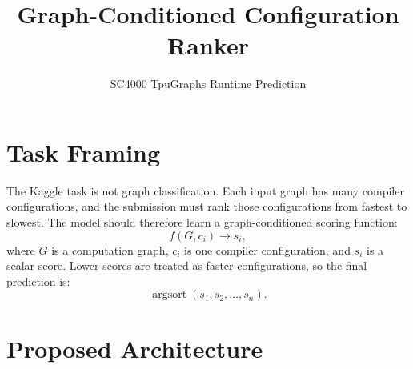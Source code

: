 \documentclass[11pt]{article}
\title{Graph-Conditioned Configuration Ranker}
\author{SC4000 TpuGraphs Runtime Prediction}
\date{}
\begin{document}
\maketitle

\section{Task Framing}

The Kaggle task is not graph classification. Each input graph has many compiler
configurations, and the submission must rank those configurations from fastest to
slowest. The model should therefore learn a graph-conditioned scoring function:
\[
f(G, c_i) \rightarrow s_i,
\]
where \(G\) is a computation graph, \(c_i\) is one compiler configuration, and
\(s_i\) is a scalar score. Lower scores are treated as faster configurations, so
the final prediction is:
\[
\operatorname{argsort}(s_1, s_2, \ldots, s_n).
\]

\section{Proposed Architecture}
\end{document}
